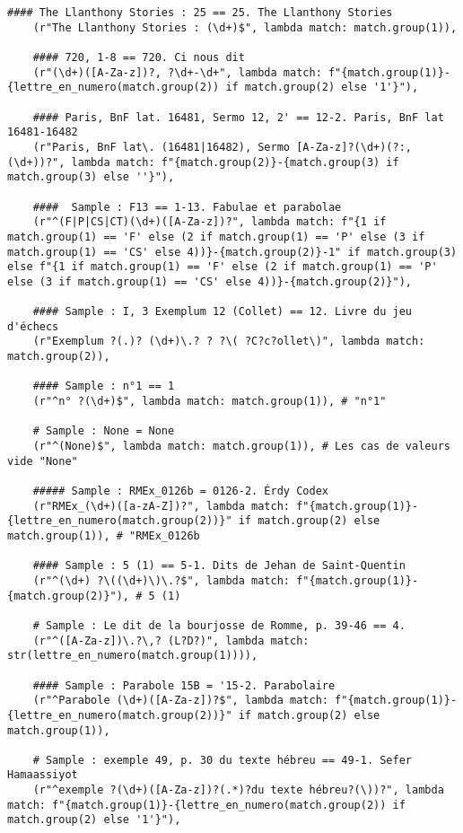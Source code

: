 \begin{lstlisting}[breaklines=true]
	#### The Llanthony Stories : 25 == 25. The Llanthony Stories
	(r"The Llanthony Stories : (\d+)$", lambda match: match.group(1)), 
	
	#### 720, 1-8 == 720. Ci nous dit
	(r"(\d+)([A-Za-z])?, ?\d+-\d+", lambda match: f"{match.group(1)}-{lettre_en_numero(match.group(2)) if match.group(2) else '1'}"),
	
	#### Paris, BnF lat. 16481, Sermo 12, 2' == 12-2. Paris, BnF lat 16481-16482
	(r"Paris, BnF lat\. (16481|16482), Sermo [A-Za-z]?(\d+)(?:, (\d+))?", lambda match: f"{match.group(2)}-{match.group(3) if match.group(3) else ''}"),
	
	####  Sample : F13 == 1-13. Fabulae et parabolae
	(r"^(F|P|CS|CT)(\d+)([A-Za-z])?", lambda match: f"{1 if match.group(1) == 'F' else (2 if match.group(1) == 'P' else (3 if match.group(1) == 'CS' else 4))}-{match.group(2)}-1" if match.group(3) else f"{1 if match.group(1) == 'F' else (2 if match.group(1) == 'P' else (3 if match.group(1) == 'CS' else 4))}-{match.group(2)}"),
	
	#### Sample : I, 3 Exemplum 12 (Collet) == 12. Livre du jeu d'échecs
	(r"Exemplum ?(.)? (\d+)\.? ? ?\( ?C?c?ollet\)", lambda match: match.group(2)),
	
	#### Sample : n°1 == 1 
	(r"^n° ?(\d+)$", lambda match: match.group(1)), # "n°1"
	
	# Sample : None = None 
	(r"^(None)$", lambda match: match.group(1)), # Les cas de valeurs vide "None"
	
	##### Sample : RMEx_0126b = 0126-2. Érdy Codex
	(r"RMEx_(\d+)([a-zA-Z])?", lambda match: f"{match.group(1)}-{lettre_en_numero(match.group(2))}" if match.group(2) else match.group(1)), # "RMEx_0126b
	
	#### Sample : 5 (1) == 5-1. Dits de Jehan de Saint-Quentin
	(r"^(\d+) ?\((\d+)\)\.?$", lambda match: f"{match.group(1)}-{match.group(2)}"), # 5 (1)
	
	# Sample : Le dit de la bourjosse de Romme, p. 39-46 == 4. 
	(r"^([A-Za-z])\.?\,? (L?D?)", lambda match: str(lettre_en_numero(match.group(1)))), 
	
	#### Sample : Parabole 15B = '15-2. Parabolaire
	(r"^Parabole (\d+)([A-Za-z])?$", lambda match: f"{match.group(1)}-{lettre_en_numero(match.group(2))}" if match.group(2) else match.group(1)),
	
	# Sample : exemple 49, p. 30 du texte hébreu == 49-1. Sefer Hamaassiyot
	(r"^exemple ?(\d+)([A-Za-z])?(.*)?du texte hébreu?(\))?", lambda match: f"{match.group(1)}-{lettre_en_numero(match.group(2)) if match.group(2) else '1'}"), 
	

\end{lstlisting}

